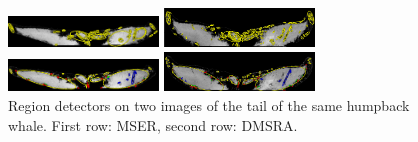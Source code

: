 \documentclass{article}
\begin{document}
\begin{figure}[htb]

\begin{minipage}[b]{.48\linewidth}
  \centering
  \centerline{\includegraphics[width=4.0cm]{./Figs/mserTailA}}
\end{minipage}
\begin{minipage}[b]{0.48\linewidth}
  \centering
  \centerline{\includegraphics[width=4.0cm]{./Figs/mserTailB}}
\end{minipage}
\begin{minipage}[b]{.48\linewidth}
  \centering
  \centerline{\includegraphics[width=4.0cm]{./Figs/dmsrTailA}}
\end{minipage}
\begin{minipage}[b]{0.48\linewidth}
  \centering
  \centerline{\includegraphics[width=4.0cm]{./Figs/dmsrTailB}}
\end{minipage}
 \vspace{-0.2cm}
\caption{Region detectors on two images of the tail of the same humpback whale. 
First row: MSER, second row: DMSRA.}
\label{fig:tails}
\end{figure}
\end{document}

